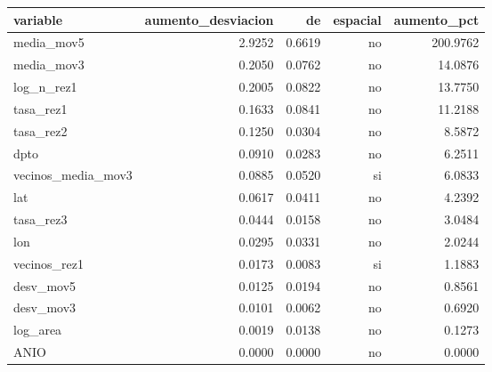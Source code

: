 \begin{tabular}{lrrrr}
\toprule
variable & aumento\_desviacion & de & espacial & aumento\_pct \\
\midrule
media\_mov5 & 2.9252 & 0.6619 & no & 200.9762 \\
media\_mov3 & 0.2050 & 0.0762 & no & 14.0876 \\
log\_n\_rez1 & 0.2005 & 0.0822 & no & 13.7750 \\
tasa\_rez1 & 0.1633 & 0.0841 & no & 11.2188 \\
tasa\_rez2 & 0.1250 & 0.0304 & no & 8.5872 \\
dpto & 0.0910 & 0.0283 & no & 6.2511 \\
vecinos\_media\_mov3 & 0.0885 & 0.0520 & si & 6.0833 \\
lat & 0.0617 & 0.0411 & no & 4.2392 \\
tasa\_rez3 & 0.0444 & 0.0158 & no & 3.0484 \\
lon & 0.0295 & 0.0331 & no & 2.0244 \\
vecinos\_rez1 & 0.0173 & 0.0083 & si & 1.1883 \\
desv\_mov5 & 0.0125 & 0.0194 & no & 0.8561 \\
desv\_mov3 & 0.0101 & 0.0062 & no & 0.6920 \\
log\_area & 0.0019 & 0.0138 & no & 0.1273 \\
ANIO & 0.0000 & 0.0000 & no & 0.0000 \\
\bottomrule
\end{tabular}
